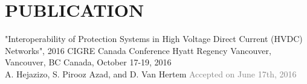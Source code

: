 \section{PUBLICATION}
"Interoperability of Protection Systems in High Voltage Direct Current (HVDC) Networks", 2016 CIGRE Canada Conference 
Hyatt Regency Vancouver, Vancouver, BC Canada, October 17-19, 2016 \\
A. Hejazizo, S. Pirooz Azad, and D. Van Hertem  \hfill \textcolor{gray}{Accepted on June 17th, 2016}


%


\vspace{-1em}
